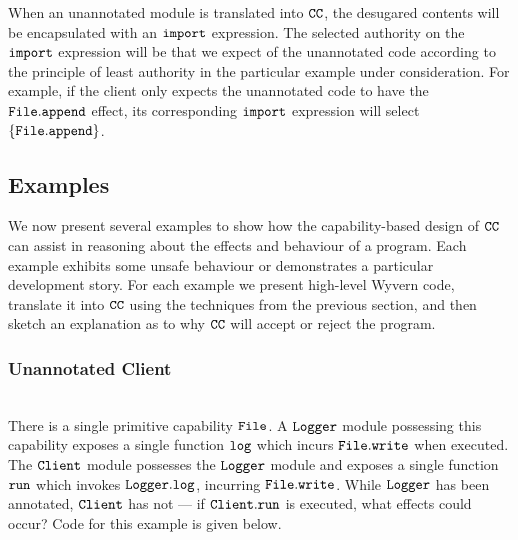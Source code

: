 When an unannotated module is translated into $\mathtt{CC}$, the desugared contents will be encapsulated with an $\mathtt{import}$ expression. The selected authority on the $\mathtt{import}$ expression will be that we expect of the unannotated code according to the principle of least authority in the particular example under consideration. For example, if the client only expects the unannotated code to have the $\mathtt{File.append}$ effect, its corresponding $\mathtt{import}$ expression will select $\mathtt{\{File.append\}}$.


\subsection{Examples}

We now present several examples to show how the capability-based design of $\mathtt{CC}$ can assist in reasoning about the effects and behaviour of a program. Each example exhibits some unsafe behaviour or demonstrates a particular development story. For each example we present high-level Wyvern code, translate it into $\mathtt{CC}$ using the techniques from the previous section, and then sketch an explanation as to why $\mathtt{CC}$ will accept or reject the program.\\









































\subsubsection{Unannotated Client}~\\

There is a single primitive capability $\mathtt{File}$. A $\mathtt{Logger}$ module possessing this capability exposes a single function $\mathtt{log}$ which incurs $\mathtt{File.write}$ when executed. The $\mathtt{Client}$ module possesses the $\mathtt{Logger}$ module and exposes a single function $\mathtt{run}$ which invokes $\mathtt{Logger.log}$, incurring $\mathtt{File.write}$. While $\mathtt{Logger}$ has been annotated, $\mathtt{Client}$ has not --- if $\mathtt{Client.run}$ is executed, what effects could occur? Code for this example is given below. 

